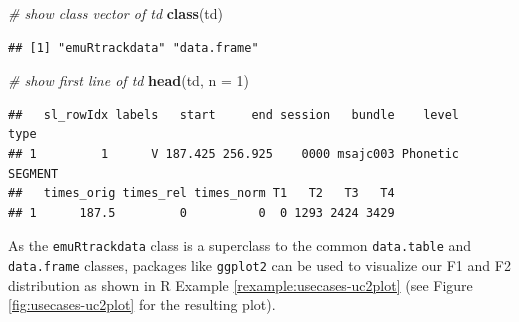 \documentclass[]{book}
\newenvironment{Shaded}{\begin{snugshade}}{\end{snugshade}}
\newcommand{\CommentTok}[1]{\textcolor[rgb]{0.56,0.35,0.01}{\textit{#1}}}
\newcommand{\DataTypeTok}[1]{\textcolor[rgb]{0.13,0.29,0.53}{#1}}
\newcommand{\DecValTok}[1]{\textcolor[rgb]{0.00,0.00,0.81}{#1}}
\newcommand{\KeywordTok}[1]{\textcolor[rgb]{0.13,0.29,0.53}{\textbf{#1}}}
\newcommand{\NormalTok}[1]{#1}
\newcommand{\OperatorTok}[1]{\textcolor[rgb]{0.81,0.36,0.00}{\textbf{#1}}}
\newcommand{\OtherTok}[1]{\textcolor[rgb]{0.56,0.35,0.01}{#1}}
\newcommand{\StringTok}[1]{\textcolor[rgb]{0.31,0.60,0.02}{#1}}
\theoremstyle{definition}
\theoremstyle{definition}
\theoremstyle{definition}
\theoremstyle{remark}
\begin{document}
\begin{Shaded}
\begin{Highlighting}[]
\CommentTok{# show class vector of td}
\KeywordTok{class}\NormalTok{(td)}
\end{Highlighting}
\end{Shaded}

\begin{verbatim}
## [1] "emuRtrackdata" "data.frame"
\end{verbatim}

\begin{Shaded}
\begin{Highlighting}[]
\CommentTok{# show first line of td}
\KeywordTok{head}\NormalTok{(td, }\DataTypeTok{n =} \DecValTok{1}\NormalTok{)}
\end{Highlighting}
\end{Shaded}

\begin{verbatim}
##   sl_rowIdx labels   start     end session   bundle    level    type
## 1         1      V 187.425 256.925    0000 msajc003 Phonetic SEGMENT
##   times_orig times_rel times_norm T1   T2   T3   T4
## 1      187.5         0          0  0 1293 2424 3429
\end{verbatim}

As the \texttt{emuRtrackdata} class is a superclass to the common
\texttt{data.table} and \texttt{data.frame} classes, packages like
\texttt{ggplot2} can be used to visualize our F1 and F2 distribution as
shown in R Example \ref{rexample:usecases-uc2plot} (see Figure
\ref{fig:usecases-uc2plot} for the resulting plot).

\begin{Shaded}
\end{Shaded}
\end{document}
